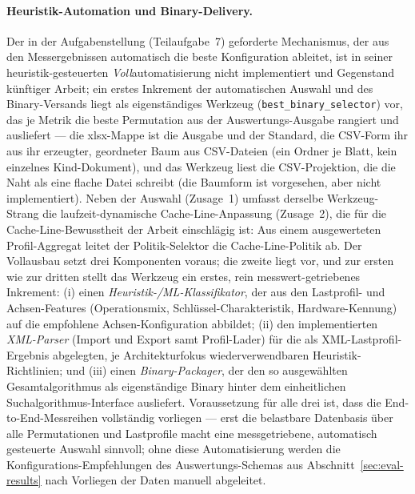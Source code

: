 \begin{nurlang}
\paragraph{Heuristik-Automation und Binary-Delivery.} Der in der Aufgabenstellung (Teilaufgabe~7)
geforderte Mechanismus, der aus den Messergebnissen automatisch die beste Konfiguration ableitet, ist
in seiner heuristik-gesteuerten \emph{Voll}automatisierung nicht implementiert und Gegenstand künftiger
Arbeit; ein erstes Inkrement der automatischen Auswahl und des Binary-Versands liegt als
eigenständiges Werkzeug (\texttt{best\_binary\_selector}) vor, das je Metrik die beste Permutation aus
der Auswertungs-Ausgabe rangiert und ausliefert --- die xlsx-Mappe ist die Ausgabe und der Standard, die
CSV-Form ihr aus ihr erzeugter, geordneter Baum aus CSV-Dateien (ein Ordner je Blatt, kein einzelnes
Kind-Dokument), und das Werkzeug liest die CSV-Projektion, die die Naht als eine flache Datei schreibt (die
Baumform ist vorgesehen, aber nicht implementiert). Neben der Auswahl (Zusage~1) umfasst
derselbe Werkzeug-Strang die
laufzeit-dynamische Cache-Line-Anpassung (Zusage~2), die für die Cache-Line-Bewusstheit der Arbeit
einschlägig ist: Aus einem ausgewerteten Profil-Aggregat leitet der Politik-Selektor die Cache-Line-Politik
ab. Der Vollausbau setzt drei Komponenten voraus; die zweite liegt vor, und zur ersten wie zur dritten
stellt das Werkzeug ein erstes, rein messwert-getriebenes Inkrement: (i) einen
\emph{Heuristik-/ML-Klassifikator}, der aus den Lastprofil- und Achsen-Features (Operationsmix,
Schlüssel-Charakteristik, Hardware-Kennung) auf die empfohlene Achsen-Konfiguration abbildet; (ii) den
implementierten \emph{XML-Parser} (Import und Export samt Profil-Lader) für die als
XML-Lastprofil-Ergebnis abgelegten, je Architekturfokus wiederverwendbaren Heuristik-Richtlinien; und
(iii) einen \emph{Binary-Packager}, der den so ausgewählten Gesamtalgorithmus als eigenständige Binary
hinter dem einheitlichen Suchalgorithmus-Interface ausliefert. Voraussetzung für alle drei ist, dass die
End-to-End-Messreihen vollständig vorliegen --- erst die belastbare Datenbasis über alle Permutationen
und Lastprofile macht eine messgetriebene, automatisch gesteuerte Auswahl sinnvoll; ohne diese Automatisierung werden
die Konfigurations-Empfehlungen des Auswertungs-Schemas aus Abschnitt~\ref{sec:eval-results} nach
Vorliegen der Daten manuell abgeleitet.


\end{nurlang}
